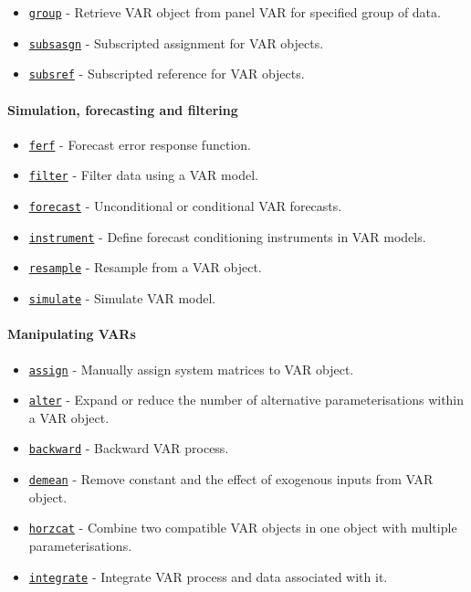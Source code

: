 \begin{itemize}
\itemsep1pt\parskip0pt
\item
  \href{VAR/group}{\texttt{group}} - Retrieve VAR object from panel VAR
  for specified group of data.
\item
  \href{VAR/subsasgn}{\texttt{subsasgn}} - Subscripted assignment for
  VAR objects.
\item
  \href{VAR/subsref}{\texttt{subsref}} - Subscripted reference for VAR
  objects.
\end{itemize}

\paragraph{Simulation, forecasting and
filtering}\label{simulation-forecasting-and-filtering}

\begin{itemize}
\itemsep1pt\parskip0pt
\item
  \href{VAR/ferf}{\texttt{ferf}} - Forecast error response function.
\item
  \href{VAR/filter}{\texttt{filter}} - Filter data using a VAR model.
\item
  \href{VAR/forecast}{\texttt{forecast}} - Unconditional or conditional
  VAR forecasts.
\item
  \href{VAR/instrument}{\texttt{instrument}} - Define forecast
  conditioning instruments in VAR models.
\item
  \href{VAR/resample}{\texttt{resample}} - Resample from a VAR object.
\item
  \href{VAR/simulate}{\texttt{simulate}} - Simulate VAR model.
\end{itemize}

\paragraph{Manipulating VARs}\label{manipulating-vars}

\begin{itemize}
\itemsep1pt\parskip0pt
\item
  \href{VAR/assign}{\texttt{assign}} - Manually assign system matrices
  to VAR object.
\item
  \href{VAR/alter}{\texttt{alter}} - Expand or reduce the number of
  alternative parameterisations within a VAR object.
\item
  \href{VAR/backward}{\texttt{backward}} - Backward VAR process.
\item
  \href{VAR/demean}{\texttt{demean}} - Remove constant and the effect of
  exogenous inputs from VAR object.
\item
  \href{VAR/horzcat}{\texttt{horzcat}} - Combine two compatible VAR
  objects in one object with multiple parameterisations.
\item
  \href{VAR/integrate}{\texttt{integrate}} - Integrate VAR process and
  data associated with it.
\end{itemize}

